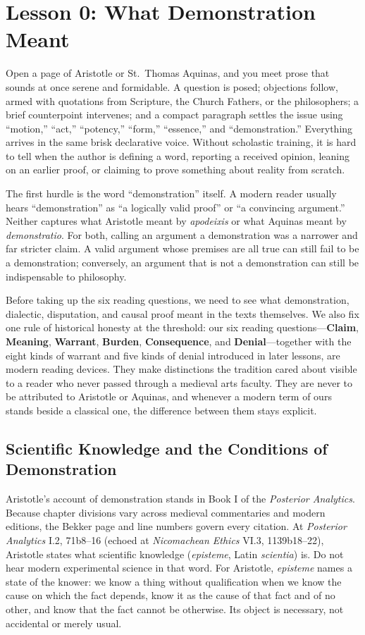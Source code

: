 \section{Lesson 0: What Demonstration Meant}

Open a page of Aristotle or St.\ Thomas Aquinas, and you meet prose that sounds at once serene and formidable. A question is posed; objections follow, armed with quotations from Scripture, the Church Fathers, or the philosophers; a brief counterpoint intervenes; and a compact paragraph settles the issue using ``motion,'' ``act,'' ``potency,'' ``form,'' ``essence,'' and ``demonstration.'' Everything arrives in the same brisk declarative voice. Without scholastic training, it is hard to tell when the author is defining a word, reporting a received opinion, leaning on an earlier proof, or claiming to prove something about reality from scratch.

The first hurdle is the word ``demonstration'' itself. A modern reader usually hears ``demonstration'' as ``a logically valid proof'' or ``a convincing argument.'' Neither captures what Aristotle meant by \emph{apodeixis} or what Aquinas meant by \emph{demonstratio}. For both, calling an argument a demonstration was a narrower and far stricter claim. A valid argument whose premises are all true can still fail to be a demonstration; conversely, an argument that is not a demonstration can still be indispensable to philosophy.

Before taking up the six reading questions, we need to see what demonstration, dialectic, disputation, and causal proof meant in the texts themselves. We also fix one rule of historical honesty at the threshold: our six reading questions---\textbf{Claim}, \textbf{Meaning}, \textbf{Warrant}, \textbf{Burden}, \textbf{Consequence}, and \textbf{Denial}---together with the eight kinds of warrant and five kinds of denial introduced in later lessons, are modern reading devices. They make distinctions the tradition cared about visible to a reader who never passed through a medieval arts faculty. They are never to be attributed to Aristotle or Aquinas, and whenever a modern term of ours stands beside a classical one, the difference between them stays explicit.

\subsection{Scientific Knowledge and the Conditions of Demonstration}

Aristotle's account of demonstration stands in Book I of the \emph{Posterior Analytics}. Because chapter divisions vary across medieval commentaries and modern editions, the Bekker page and line numbers govern every citation. At \emph{Posterior Analytics} I.2, 71b8--16 (echoed at \emph{Nicomachean Ethics} VI.3, 1139b18--22), Aristotle states what scientific knowledge (\emph{episteme}, Latin \emph{scientia}) is. Do not hear modern experimental science in that word. For Aristotle, \emph{episteme} names a state of the knower: we know a thing without qualification when we know the cause on which the fact depends, know it as the cause of that fact and of no other, and know that the fact cannot be otherwise. Its object is necessary, not accidental or merely usual.

